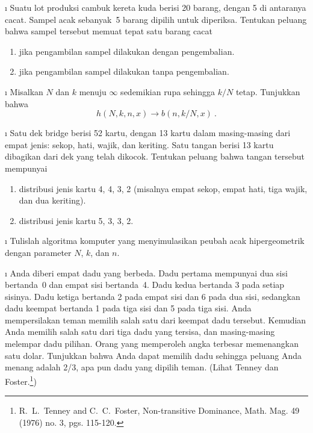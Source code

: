 \begin{LJSItem}
\i\label{exer 5.1.23} Suatu lot produksi cambuk kereta kuda berisi 20 barang, dengan
5 di antaranya cacat. Sampel acak sebanyak~5 barang dipilih untuk diperiksa. Tentukan
peluang bahwa sampel tersebut memuat tepat satu barang cacat
\begin{enumerate}
\item jika pengambilan sampel dilakukan dengan pengembalian.

\item jika pengambilan sampel dilakukan tanpa pengembalian.
\end{enumerate}

\i\label{exer 5.1.28} Misalkan $N$ dan $k$ menuju $\infty$ sedemikian rupa sehingga
$k/N$ tetap. Tunjukkan bahwa
$$h(N, k, n, x) \rightarrow b(n, k/N, x)\ .$$

\i\label{exer 5.1.24} Satu dek bridge berisi 52 kartu, dengan 13 kartu
dalam masing-masing dari empat jenis: sekop, hati, wajik, dan keriting. Satu tangan
berisi 13 kartu dibagikan dari dek yang telah dikocok. Tentukan peluang bahwa tangan
tersebut mempunyai
\begin{enumerate}

\item distribusi jenis kartu 4, 4, 3, 2 (misalnya empat sekop, empat hati, tiga wajik,
dan dua keriting).

\item distribusi jenis kartu 5, 3, 3, 2.
\end{enumerate}

\i\label{exer 5.1.125} Tulislah algoritma komputer yang menyimulasikan peubah acak
hipergeometrik dengan parameter $N$,  $k$, dan $n$.

\i\label{exer 7.1.9} Anda diberi empat dadu yang berbeda. Dadu pertama mempunyai dua
sisi bertanda~0 dan empat sisi bertanda~4. Dadu kedua bertanda 3 pada setiap sisinya.
Dadu ketiga bertanda 2 pada empat sisi dan 6 pada dua sisi, sedangkan dadu keempat
bertanda 1 pada tiga sisi dan 5 pada tiga sisi. Anda mempersilakan teman memilih salah
satu dari keempat dadu tersebut. Kemudian Anda memilih salah satu dari tiga dadu yang
tersisa, dan masing-masing melempar dadu pilihan. Orang yang memperoleh angka terbesar
memenangkan satu dolar. Tunjukkan bahwa Anda dapat memilih dadu sehingga peluang Anda
menang adalah 2/3, apa pun dadu yang dipilih teman. (Lihat Tenney dan
Foster.\footnote{R.~L.~Tenney and C.~C.~Foster,  \emx 
{Non-transitive Dominance}, Math. Mag. 49 (1976) no. 3, pgs. 115-120.})


\end{LJSItem}

